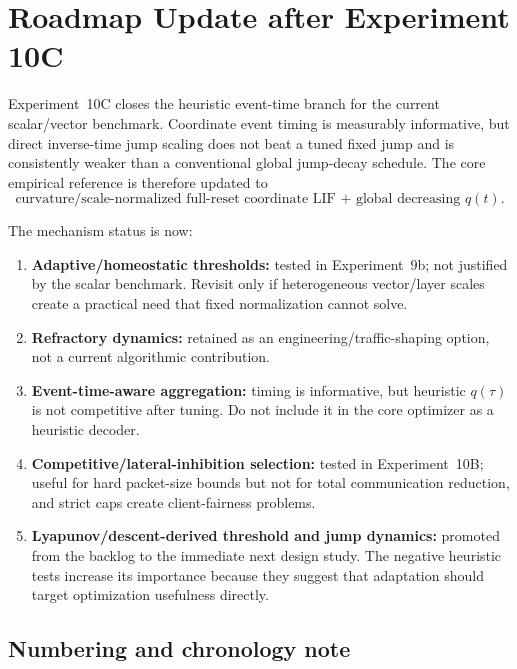 \section{Roadmap Update after Experiment 10C}
\label{sec:roadmap-post-10c}

Experiment~10C closes the heuristic event-time branch for the current scalar/vector benchmark. Coordinate event timing is measurably informative, but direct inverse-time jump scaling does not beat a tuned fixed jump and is consistently weaker than a conventional global jump-decay schedule. The core empirical reference is therefore updated to
\begin{equation}
  \boxed{\text{curvature/scale-normalized full-reset coordinate LIF + global decreasing }q(t).}
\end{equation}

The mechanism status is now:
\begin{enumerate}
  \item \textbf{Adaptive/homeostatic thresholds:} tested in Experiment~9b; not justified by the scalar benchmark. Revisit only if heterogeneous vector/layer scales create a practical need that fixed normalization cannot solve.
  \item \textbf{Refractory dynamics:} retained as an engineering/traffic-shaping option, not a current algorithmic contribution.
  \item \textbf{Event-time-aware aggregation:} timing is informative, but heuristic $q(\tau)$ is not competitive after tuning. Do not include it in the core optimizer as a heuristic decoder.
  \item \textbf{Competitive/lateral-inhibition selection:} tested in Experiment~10B; useful for hard packet-size bounds but not for total communication reduction, and strict caps create client-fairness problems.
  \item \textbf{Lyapunov/descent-derived threshold and jump dynamics:} promoted from the backlog to the immediate next design study. The negative heuristic tests increase its importance because they suggest that adaptation should target optimization usefulness directly.
\end{enumerate}

\subsection{Numbering and chronology note}
\label{sec:numbering-chronology-note}

